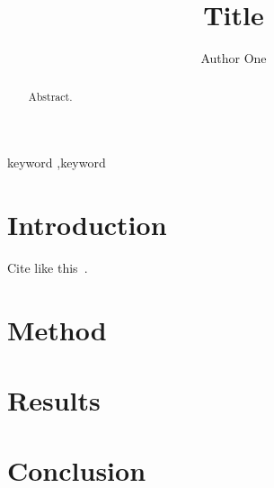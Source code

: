 \documentclass[preprint,12pt]{elsarticle}
\begin{document}
\begin{frontmatter}
\title{Title}
\author{Author One}
\begin{abstract}
Abstract.
\end{abstract}
\begin{keyword}
keyword \sep keyword
\end{keyword}
\end{frontmatter}
\section{Introduction}
Cite like this~\cite{example2026}.
\section{Method}
\section{Results}
\section{Conclusion}


\end{document}
